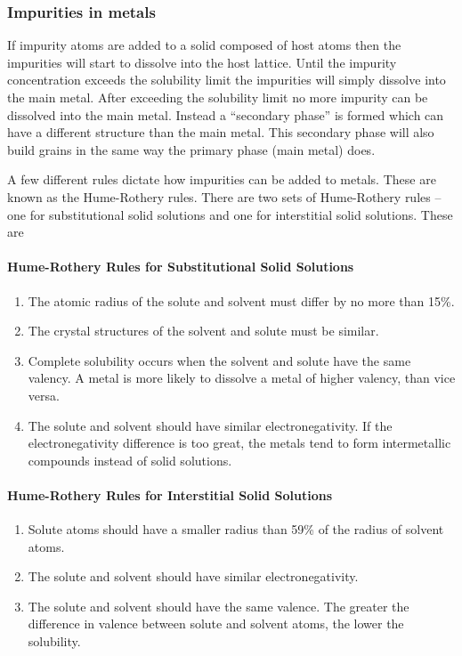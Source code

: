 \subsubsection{Impurities in metals}
If impurity atoms are added to a solid composed of host atoms then the impurities will start to dissolve into the host lattice. Until the impurity concentration exceeds the solubility limit the impurities will simply dissolve into the main metal. After exceeding the solubility limit no more impurity can be dissolved into the main metal. Instead a ``secondary phase'' is formed which can have a different structure than the main metal. This secondary phase will also build grains in the same way the primary phase (main metal) does.

A few different rules dictate how impurities can be added to metals. These are known as the Hume-Rothery rules. There are two sets of Hume-Rothery rules -- one for substitutional solid solutions and one for interstitial solid solutions. These are

\paragraph{Hume-Rothery Rules for Substitutional Solid Solutions}
\begin{enumerate}
  \item The atomic radius of the solute and solvent must differ by no more than 15\%.
  \item The crystal structures of the solvent and solute must be similar.
  \item Complete solubility occurs when the solvent and solute have the same valency. A metal is more likely to dissolve a metal of higher valency, than vice versa.
  \item The solute and solvent should have similar electronegativity. If the electronegativity difference is too great, the metals tend to form intermetallic compounds instead of solid solutions.
\end{enumerate}

\paragraph{Hume-Rothery Rules for Interstitial Solid Solutions}
\begin{enumerate}
  \item Solute atoms should have a smaller radius than 59\% of the radius of solvent atoms.
  \item The solute and solvent should have similar electronegativity.
  \item The solute and solvent should have the same valence. The greater the difference in valence between solute and solvent atoms, the lower the solubility.
\end{enumerate}

